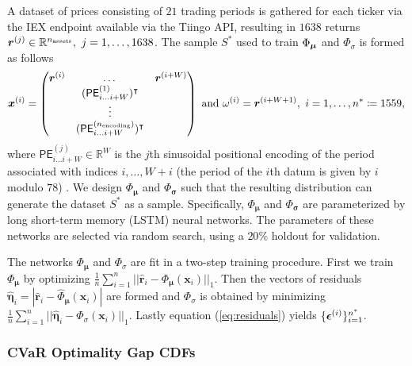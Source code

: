 A dataset of prices consisting of $21$ trading periods is gathered for each ticker via the IEX endpoint available via the Tiingo API, resulting in $1638$ returns $\boldsymbol{r}^{(j)} \in \mathbb{R}^{n_{\text{assets}}}, \ j = 1,\hdots, 1638$. The sample $S^*$ used to train $\Phi_{\boldsymbol{\mu}}$ and $\Phi_{\sigma}$ is formed as follows
\[
\boldsymbol{x}^{(i)} = \begin{pmatrix}
 \boldsymbol{r}^{(i)} & \dots & \boldsymbol{r}^{(i+W)} \\
    & (\textsf{PE}^{(1)}_{i \hdots i+W})^{\intercal} & \\
    & \vdots & \\
    & (\textsf{PE}^{(n_{\text{encoding}})}_{i \hdots i+W})^{\intercal}&
 \end{pmatrix}\  \text{and} \ \omega^{(i)} = \boldsymbol{r}^{(i+W+1)}, \ i = 1,\hdots,  n^* \coloneq 1559,
\]
where $\textsf{PE}^{(j)}_{i \hdots i+W} \in \mathbb{R}^{W}$ is the $j$th sinusoidal positional encoding of the period associated with indices $i,\hdots, W+i$ (the period of the $i$th datum is given by $i$ modulo $78$) \citep{vaswani2017attention}. We design $\Phi_{\boldsymbol{\mu}}$ and $\Phi_{\boldsymbol{\sigma}}$ such that the resulting distribution can generate the dataset $S^*$ as a sample. Specifically,  $\Phi_{\boldsymbol{\mu}}$ and $\Phi_{\boldsymbol{\sigma}}$ are parameterized by long short-term memory (LSTM) neural networks. The parameters of these networks are selected via random search, using a $20\%$ holdout for validation.

The networks $\Phi_{\boldsymbol{\mu}}$ and $\Phi_{\sigma}$ are fit in a two-step training procedure. First we train $\Phi_{\boldsymbol{\mu}}$ by optimizing \hbox{$\frac{1}{n}\sum_{i=1}^n|| \hat{\boldsymbol{r}}_i - \Phi_{\boldsymbol{\mu}}(\boldsymbol{x}_i)||_1$}. Then the vectors of residuals $\hat{\boldsymbol{\eta}}_i = |\hat{\boldsymbol{r}}_i - \hat{\Phi}_{\boldsymbol{\mu}}(\boldsymbol{x}_i)|$ are formed and $\Phi_{\sigma}$ is obtained by minimizing \hbox{$\frac{1}{n}\sum_{i=1}^n|| \hat{\boldsymbol{\eta}}_i - \Phi_{\sigma}(\boldsymbol{x}_i)||_1$}. Lastly equation (\ref{eq:residuals}) yields $\{\boldsymbol{\epsilon}^{(i)}\}_{i=1}^{n^*}$.



\subsubsection{CVaR Optimality Gap CDFs}\label{appendix:cvar_performance}

